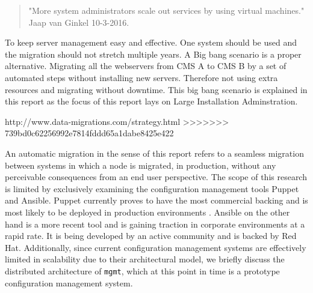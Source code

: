 \begin{quote}
"More system administrators scale out services by using virtual machines." Jaap van Ginkel 10-3-2016.
\end{quote}

To keep server management easy and effective. One system should be used and the migration should not stretch multiple years. A Big bang scenario is a proper alternative. Migrating all the webservers from CMS A to CMS B by a set of automated steps without installing new servers. Therefore not using extra resources and migrating without downtime. This big bang scenario is explained in this report as the focus of this report lays on Large Installation Adminstration.

     
http://www.data-migrations.com/strategy.html
>>>>>>> 739bd0c62256992e7814fddd65a1dabe8425e422

\noindent
An automatic migration in the sense of this report refers to a seamless migration between systems in which a node is migrated, in production, without any perceivable consequences from an end user perspective. The scope of this research is limited by exclusively examining the configuration management tools Puppet and Ansible. Puppet currently proves to have the most commercial backing and is most likely to be deployed in production environments \cite{tecosystems_2013}. Ansible on the other hand is a more recent tool and is gaining traction in corporate environments at a rapid rate. It is being developed by an active community and is backed by Red Hat. Additionally, since current configuration management systems are effectively limited in scalability due to their architectural model, we briefly discuss the distributed architecture of \texttt{mgmt}, which at this point in time is a prototype configuration management system.
